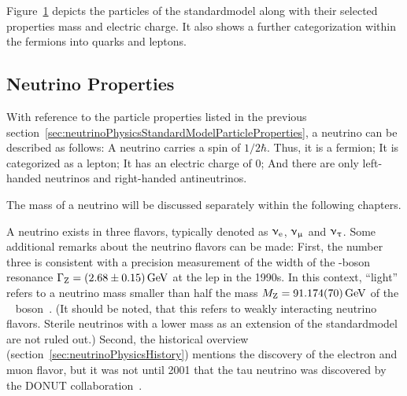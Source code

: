 Figure~\ref{fig:standardmodel} depicts the particles of the \gls{standardmodel} along with their selected properties mass and electric charge. It also shows a further categorization within the fermions into quarks and leptons.
\FloatBarrier
\begin{figure}[t]
	\begin{center}
		\def\svgwidth{\linewidth}
	\end{center}
	\label{fig:standardmodel}
\end{figure}

\subsection{Neutrino Properties}
\label{sec:neutrinoPhysicsStandardModelNeutrinos}
With reference to the particle properties listed in the previous section~\ref{sec:neutrinoPhysicsStandardModelParticleProperties}, a neutrino can be described as follows: A neutrino carries a spin of $1/2 \hbar$. Thus, it is a fermion; It is categorized as a lepton; It has an electric charge of 0; And there are only left-handed neutrinos and right-handed antineutrinos. 

The mass of a neutrino will be discussed separately within the following chapters. 

A neutrino exists in three flavors, typically denoted as $\upnu_\mathrm{e}$, $\upnu_\upmu$ and $\upnu_\uptau$. Some additional remarks about the neutrino flavors can be made: First, the number three is consistent with a precision measurement of the width of the -boson resonance $\Gamma_\mathrm{Z}=\SI[separate-uncertainty=true]{2.68\pm0.15}{GeV}$ at the \gls{lep} in the 1990s. In this context, ``light'' refers to a neutrino mass smaller than half the mass $M_\mathrm{Z}=\SI{91.174\pm0.070}{GeV}$ of the ~ boson~\cite{NumberOfNeutrinos}. (It should be noted, that this refers to weakly interacting neutrino flavors. Sterile neutrinos with a lower mass as an extension of the \gls{standardmodel} are not ruled out\cite{Otten:2008zz}.) Second, the historical overview (section~\ref{sec:neutrinoPhysicsHistory}) mentions the discovery of the electron and muon flavor, but it was not until 2001 that the tau neutrino was discovered by the DONUT collaboration~\cite{Kodama2000}.

